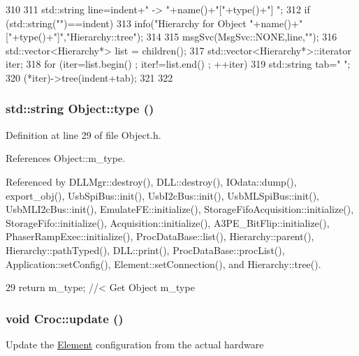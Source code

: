\begin{DoxyCode}
310                                     {
311   std::string line=indent+" -> "+name()+"["+type()+"] ";
312   if (std::string("")==indent){
313     info("Hierarchy for Object "+name()+"["+type()+"]","Hierarchy::tree");
314   }
315   msgSvc(MsgSvc::NONE,line,"");
316   std::vector<Hierarchy*> list = children();
317   std::vector<Hierarchy*>::iterator iter;
318   for (iter=list.begin() ; iter!=list.end() ; ++iter){
319     std::string tab="  ";
320     (*iter)->tree(indent+tab);
321   }
322 }
\end{DoxyCode}
\hypertarget{classObject_a84f99f70f144a83e1582d1d0f84e4e62}{
\subsubsection[{type}]{\setlength{\rightskip}{0pt plus 5cm}std::string Object::type ()}}
\label{classObject_a84f99f70f144a83e1582d1d0f84e4e62}


Definition at line 29 of file Object.h.

References Object::m\_\-type.

Referenced by DLLMgr::destroy(), DLL::destroy(), IOdata::dump(), export\_\-obj(), UsbSpiBus::init(), UsbI2cBus::init(), UsbMLSpiBus::init(), UsbMLI2cBus::init(), EmulateFE::initialize(), StorageFifoAcquisition::initialize(), StorageFifo::initialize(), Acquisition::initialize(), A3PE\_\-BitFlip::initialize(), PhaserRampExec::initialize(), ProcDataBase::list(), Hierarchy::parent(), Hierarchy::pathTyped(), DLL::print(), ProcDataBase::procList(), Application::setConfig(), Element::setConnection(), and Hierarchy::tree().


\begin{DoxyCode}
29 { return m_type;       } //< Get Object m_type
\end{DoxyCode}
\hypertarget{classCroc_a74b7f08ffdc15f8244af02c8cdccbc8f}{
\subsubsection[{update}]{\setlength{\rightskip}{0pt plus 5cm}void Croc::update ()}}
\label{classCroc_a74b7f08ffdc15f8244af02c8cdccbc8f}
Update the \hyperlink{classElement}{Element} configuration from the actual hardware 

